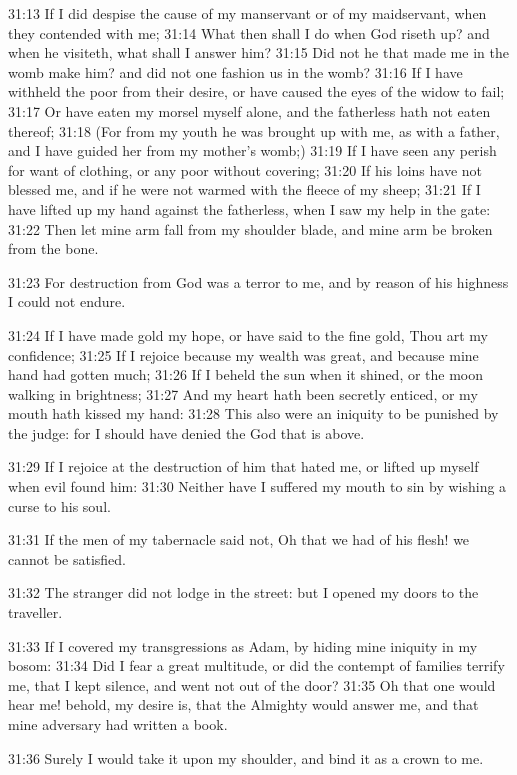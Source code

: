 31:13 If I did despise the cause of my manservant or of my
maidservant, when they contended with me; 31:14 What then shall I do
when God riseth up? and when he visiteth, what shall I answer him?
31:15 Did not he that made me in the womb make him? and did not one
fashion us in the womb?  31:16 If I have withheld the poor from their
desire, or have caused the eyes of the widow to fail; 31:17 Or have
eaten my morsel myself alone, and the fatherless hath not eaten
thereof; 31:18 (For from my youth he was brought up with me, as with a
father, and I have guided her from my mother's womb;) 31:19 If I have
seen any perish for want of clothing, or any poor without covering;
31:20 If his loins have not blessed me, and if he were not warmed with
the fleece of my sheep; 31:21 If I have lifted up my hand against the
fatherless, when I saw my help in the gate: 31:22 Then let mine arm
fall from my shoulder blade, and mine arm be broken from the bone.

31:23 For destruction from God was a terror to me, and by reason of
his highness I could not endure.

31:24 If I have made gold my hope, or have said to the fine gold, Thou
art my confidence; 31:25 If I rejoice because my wealth was great, and
because mine hand had gotten much; 31:26 If I beheld the sun when it
shined, or the moon walking in brightness; 31:27 And my heart hath
been secretly enticed, or my mouth hath kissed my hand: 31:28 This
also were an iniquity to be punished by the judge: for I should have
denied the God that is above.

31:29 If I rejoice at the destruction of him that hated me, or lifted
up myself when evil found him: 31:30 Neither have I suffered my mouth
to sin by wishing a curse to his soul.

31:31 If the men of my tabernacle said not, Oh that we had of his
flesh!  we cannot be satisfied.

31:32 The stranger did not lodge in the street: but I opened my doors
to the traveller.

31:33 If I covered my transgressions as Adam, by hiding mine iniquity
in my bosom: 31:34 Did I fear a great multitude, or did the contempt
of families terrify me, that I kept silence, and went not out of the
door?  31:35 Oh that one would hear me! behold, my desire is, that the
Almighty would answer me, and that mine adversary had written a book.

31:36 Surely I would take it upon my shoulder, and bind it as a crown
to me.


